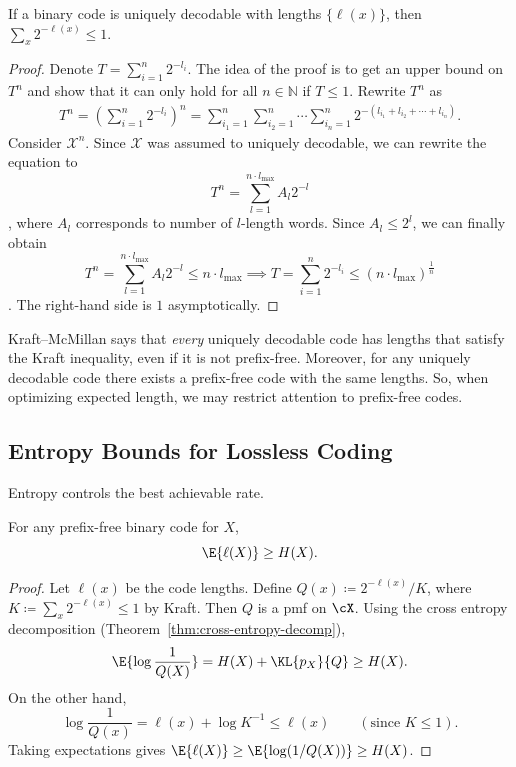 \begin{theorem}
\label{thm:kraft-mcmillan}
If a binary code is uniquely decodable with lengths $\{\ell(x)\}$, then
\(\sum_x 2^{-\ell(x)}\le 1\).
\end{theorem}


\begin{proof}
Denote $T=\sum_{i=1}^n2^{-l_i}.$ The idea of the proof is to get an upper bound on $T^n$ and show that it can only hold for all $n\in\mathbb{N}$ if $T \leq 1$.
Rewrite $T^n$ as
$$
\begin{aligned}
    T^n = \left(\sum_{i=1}^n 2^{-l_i}\right)^n=\sum_{i_1=1}^n\sum_{i_2=1}^n\cdots\sum_{i_n=1}^n2^{-(l_{i_1}+l_{i_2}+\cdots +l_{i_n})}.
\end{aligned}
$$
Consider $\mathcal{X}^n$. Since $\mathcal{X}$ was assumed to uniquely decodable, we can rewrite the equation to
$$T^n = \sum_{l=1}^{n\cdot l_{\max}} A_l 2^{-l}$$,
where $A_l$ corresponds to number of $l$-length words. Since $A_l\leq 2^{l}$, we can finally obtain
$$T^n = \sum_{l=1}^{n\cdot l_{\max}} A_l 2^{-l}\leq n\cdot l_{\max} \implies T=\sum_{i=1}^n 2^{-l_i}\leq (n \cdot l_{\max})^{\frac{1}{n}}$$. The right-hand side is $1$ asymptotically.
\end{proof}


\begin{remark}
Kraft--McMillan says that \emph{every} uniquely decodable code has lengths that satisfy the Kraft inequality, even if it is not prefix-free.
Moreover, for any uniquely decodable code there exists a prefix-free code with the same lengths.
So, when optimizing expected length, we may restrict attention to prefix-free codes.
\end{remark}

\subsection{Entropy Bounds for Lossless Coding}
\label{sec:entropy-bound}

Entropy controls the best achievable rate.

\begin{theorem}
\label{thm:entropy-lb}
For any prefix-free binary code for $X$,
\begin{equation}
    \E{\ell(X)} \ge H(X).
\end{equation}
\end{theorem}

\begin{proof}
Let $\ell(x)$ be the code lengths.
Define
\(Q(x)\coloneqq 2^{-\ell(x)}/K\), where $K\coloneqq\sum_{x}2^{-\ell(x)}\le 1$ by Kraft.
Then $Q$ is a pmf on $\cX$.
Using the cross entropy decomposition (Theorem~\ref{thm:cross-entropy-decomp}),
\[
\E{\log\frac{1}{Q(X)}}=H(X)+\KL{p_X}{Q}\ge H(X).
\]
On the other hand,
\[
\log\frac{1}{Q(x)} = \ell(x) + \log K^{-1} \le \ell(x)
\qquad (\text{since }K\le 1).
\]
Taking expectations gives $\E{\ell(X)}\ge \E{\log(1/Q(X))}\ge H(X)$.
\end{proof}


